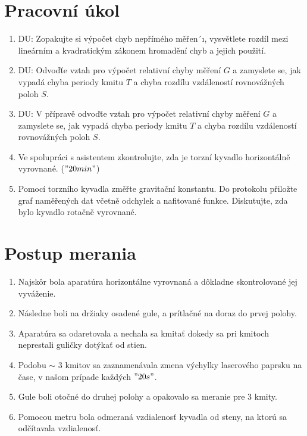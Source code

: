 \documentclass[10pt]{scrartcl}
\begin{document}
\MakeFJFIHead{}

\section{Pracovní úkol}
\begin{enumerate}
\item DU: Zopakujte si výpočet chyb nepřímého měřen´ı, vysvětlete rozdíl mezi lineárním 
a kvadratickým zákonem hromadění chyb a jejich použití.
\item DU: Odvoďťe vztah pro výpočet relativní chyby měření $G$ a zamyslete se, jak
vypadá chyba periody kmitu $T$ a chyba rozdílu vzdáleností rovnovážných poloh $S$.
\item DU: V přípravě odvoďťe vztah pro výpočet relativní chyby měření $G$ a zamyslete
se, jak vypadá chyba periody kmitu $T$ a chyba rozdílu vzdáleností
rovnovážných poloh $S$.
\item Ve spolupráci s asistentem zkontrolujte, zda je torzní kyvadlo horizontálně vyrovnané.
($"20 min"$)
\item Pomocí torzního kyvadla změřte gravitační konstantu. Do protokolu přiložte graf naměřených
dat včetně odchylek a nafitované funkce. Diskutujte, zda bylo kyvadlo rotačně vyrovnané.


\end{enumerate}

\section{Postup merania}

\begin{enumerate}
\item Najskôr bola aparatúra horizontálne vyrovnaná a dôkladne skontrolované jej vyváženie.
\item Následne boli na držiaky osadené gule, a prítlačné  na doraz do prvej polohy.
\item Aparatúra sa odaretovala a nechala sa kmitať dokedy sa pri kmitoch neprestali guličky dotýkať od stien.
\item Podobu $\sim$ 3 kmitov sa zaznamenávala zmena výchylky laserového paprsku na čase, v našom prípade každých $"20 s"$.
\item Gule boli otočné do druhej polohy a opakovalo sa meranie pre 3 kmity.
\item Pomocou metru bola odmeraná vzdialenosť kyvadla od steny, na ktorú sa odčítavala vzdialenosť. 
\end{enumerate}
\end{document}
